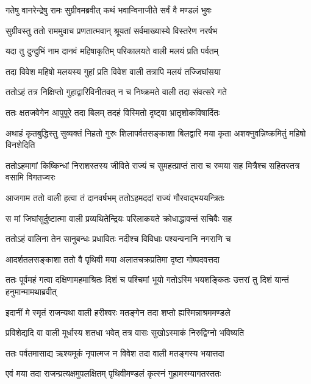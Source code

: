 
\twolineshloka
{गतेषु वानरेन्द्रेषु रामः सुग्रीवमब्रवीत्}
{कथं भवान्विनाजीते सर्वं वै मण्डलं भुवः} %

\twolineshloka
{सुग्रीवस्तु ततो राममुवाच प्रणतात्मवान्}
{श्रूयतां सर्वमाख्यास्ये विस्तरेण नरर्षभ} %

\twolineshloka
{यदा तु दुन्दुभिं नाम दानवं महिषाकृतिम्}
{परिकालयते वाली मलयं प्रति पर्वतम्} %

\twolineshloka
{तदा विवेश महिषो मलयस्य गुहां प्रति}
{विवेश वाली तत्रापि मलयं तज्जिघांसया} %

\twolineshloka
{ततोऽहं तत्र निक्षिप्तो गुहाद्वारिविनीतवत्}
{न च निष्क्रमते वाली तदा संवत्सरे गते} %

\twolineshloka
{ततः क्षतजवेगेन आपुपूरे तदा बिलम्}
{तदहं विस्मितो दृष्ट्वा भ्रातृशोकविषार्दितः} %

\threelineshloka
{अथाहं कृतबुद्धिस्तु सुव्यक्तं निहतो गुरुः}
{शिलापर्वतसङ्काशा बिलद्वारि मया कृता}
{अशक्नुवन्निष्क्रमितुं महिषो विनशेदिति} %

\threelineshloka
{ततोऽहमागां किष्किन्धां निराशस्तस्य जीविते}
{राज्यं च सुमहत्प्राप्तं तारा च रुमया सह}
{मित्रैश्च सहितस्तत्र वसामि विगतज्वरः} %

\twolineshloka
{आजगाम ततो वाली हत्वा तं दानवर्षभम्}
{ततोऽहमददां राज्यं गौरवाद्भययन्त्रितः} %

\twolineshloka
{स मां जिघांसुर्दुष्टात्मा वाली प्रव्यथितेन्द्रियः}
{परिलाकयते क्रोधाद्धावन्तं सचिवैः सह} %

\twolineshloka
{ततोऽहं वालिना तेन सानुबन्धः प्रधावितः}
{नदीश्च विविधाः पश्यन्वनानि नगराणि च} %

\twolineshloka
{आदर्शतलसङ्काशा ततो वै पृथिवी मया}
{अलातचक्रप्रतिमा दृष्टा गोष्पदवत्तदा} %

\threelineshloka
{ततः पूर्वमहं गत्वा दक्षिणामहमाश्रितः}
{दिशं च पश्चिमां भूयो गतोऽस्मि भयशङ्कितः}
{उत्तरां तु दिशं यान्तं हनुमान्मामथाब्रवीत्} %

\twolineshloka
{इदानीं मे स्मृतं राजन्यथा वाली हरीश्वरः}
{मतङ्गेन तदा शप्तो ह्यस्मिन्नाश्रममण्डले} %

\twolineshloka
{प्रविशेद्यदि वा वाली मूर्धास्य शतधा भवेत्}
{तत्र वासः सुखोऽस्माकं निरुद्विग्नो भविष्यति} %

\twolineshloka
{ततः पर्वतमासाद्य ऋश्यमूकं नृपात्मज}
{न विवेश तदा वाली मतङ्गस्य भयात्तदा} %

\twolineshloka
{एवं मया तदा राजन्प्रत्यक्षमुपलक्षितम्}
{पृथिवीमण्डलं कृत्स्नं गुहामस्म्यागतस्ततः} %


